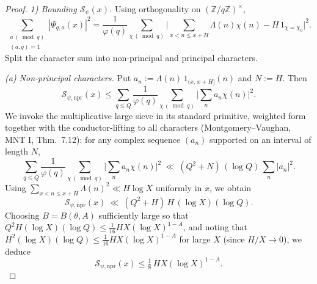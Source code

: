 \documentclass[11pt]{amsart}
\theoremstyle{definition}
\theoremstyle{remark}
\numberwithin{equation}{section}
\begin{document}
\begin{proof}
\smallskip
\noindent\emph{1) Bounding $\mathcal S_{\psi}(x)$.}
Using orthogonality on $(\mathbb Z/q\mathbb Z)^{\times}$,
\[
\sum_{\substack{a\, (\bmod q)\\ (a,q)=1}}|\Psi_{q,a}(x)|^2=\frac1{\varphi(q)}\sum_{\chi\, (\bmod q)}\Big|\sum_{x<n\le x+H}\!\Lambda(n)\chi(n)-H\,1_{\chi=\chi_0}\Big|^2.
\]
Split the character sum into non-principal and principal characters.

\emph{(a) Non-principal characters.}
Put $a_n:=\Lambda(n)\,1_{(x,\,x+H]}(n)$ and $N:=H$. Then
\[
\mathcal S_{\psi,\mathrm{npr}}(x)\le \sum_{q\le Q}\frac1{\varphi(q)}\sum_{\chi\, (\bmod q)}\Big|\sum_{n} a_n\chi(n)\Big|^2.
\]
We invoke the multiplicative large sieve in its standard primitive, weighted form together with the conductor-lifting to all characters (Montgomery–Vaughan, MNT I, Thm.\ 7.12): for any complex sequence $(a_n)$ supported on an interval of length $N$,
\[
\sum_{q\le Q}\frac1{\varphi(q)}\sum_{\chi\, (\bmod q)}\Big|\sum_{n} a_n\chi(n)\Big|^2\ \ll\ (Q^2+N)\,(\log Q)\,\sum_{n}|a_n|^2.
\]
Using $\sum_{x<n\le x+H}\!\Lambda(n)^2\ll H\log X$ uniformly in $x$, we obtain
\[
\mathcal S_{\psi,\mathrm{npr}}(x)\ \ll\ (Q^2+H)\,H\,(\log X)(\log Q).
\]
Choosing $B=B(\theta,A)$ sufficiently large so that $Q^2H(\log X)(\log Q)\le \tfrac1{16}HX(\log X)^{1-A}$, and noting that $H^2(\log X)(\log Q)\le \tfrac1{16}HX(\log X)^{1-A}$ for large $X$ (since $H/X\to0$), we deduce
\begin{equation}\label{eq:SpsiNPR}
\mathcal S_{\psi,\mathrm{npr}}(x)\le \tfrac18\,H X(\log X)^{1-A}.
\end{equation}


\end{proof}
\end{document}

